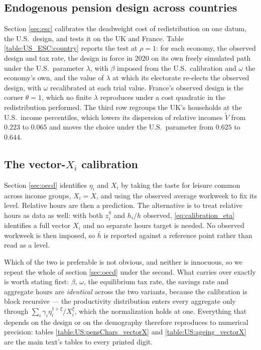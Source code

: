 

\subsection{Endogenous pension design across countries}\label{app:US:ukESC}

Section \ref{sec:esc} calibrates the deadweight cost of redistribution on one datum, the U.S.\ design, and tests it on the UK and France. Table \ref{table:US_ESC:country} reports the test at $\rho = 1$: for each economy, the observed design and tax rate, the design in force in 2020 on its own freely simulated path under the U.S.\ parameter $\lambda$, with $\beta$ imposed from the U.S.\ calibration and $\omega$ the economy's own, and the value of $\lambda$ at which its electorate re-elects the observed design, with $\omega$ recalibrated at each trial value. France's observed design is the corner $\theta = 1$, which no finite $\lambda$ reproduces under a cost quadratic in the redistribution performed. The third row regroups the UK's households at the U.S.\ income percentiles, which lowers its dispersion of relative incomes $\tilde{V}$ from $0.223$ to $0.065$ and moves the choice under the U.S.\ parameter from $0.625$ to $0.644$.



\subsection{The vector-\texorpdfstring{$X_i$}{Xi} calibration}\label{app:US:vectorX}

Section \ref{sec:oecd} identifies $\eta_i$ and $X_i$ by taking the taste for leisure common across income
groups, $X_i = X$, and using the observed average workweek to fix its level. Relative hours are then a
prediction. The alternative is to treat relative hours as data as well: with both $z_i^{\eta}$ and
$h_i/h$ observed, \eqref{eq:calibration_eta} identifies a full vector $X_i$ and no separate hours target
is needed. No observed workweek is then imposed, so $\bar h$ is reported against a reference point
rather than read as a level.

Which of the two is preferable is not obvious, and neither is innocuous, so we repeat the whole of section
\ref{sec:oecd} under the second. What carries over exactly is worth stating first: $\beta$, $\omega$, the
equilibrium tax rate, the savings rate and aggregate hours are \emph{identical} across the two variants,
because the calibration is block recursive --- the productivity distribution enters every aggregate only
through $\sum_i\gamma_i\eta_i^{1+\xi}/X_i^{\xi}$, which the normalization holds at one. Everything that
depends on the design or on the demography therefore reproduces to numerical precision: tables
\ref{table:US:pensChars_vectorX} and \ref{table:US:ageing_vectorX} are the main text's tables to every
printed digit.


